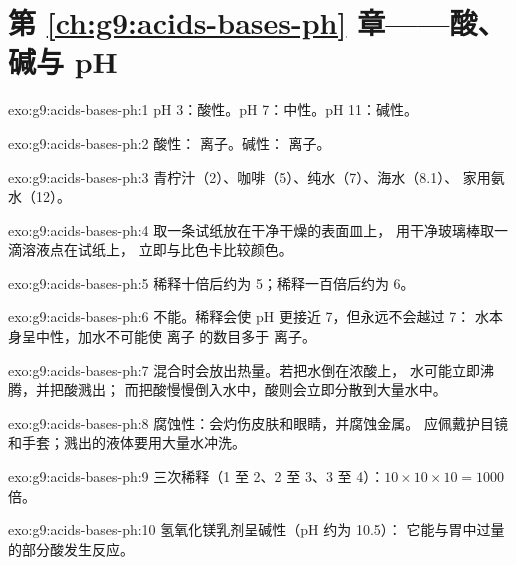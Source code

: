 \section*{第 \ref{ch:g9:acids-bases-ph} 章——酸、碱与 pH}

\begin{solution}{exo:g9:acids-bases-ph:1}
pH 3：酸性。pH 7：中性。pH 11：碱性。
\end{solution}

\begin{solution}{exo:g9:acids-bases-ph:2}
酸性： 离子。碱性： 离子。
\end{solution}

\begin{solution}{exo:g9:acids-bases-ph:3}
青柠汁（2）、咖啡（5）、纯水（7）、海水（8.1）、
家用氨水（12）。
\end{solution}

\begin{solution}{exo:g9:acids-bases-ph:4}
取一条试纸放在干净干燥的表面皿上，
用干净玻璃棒取一滴溶液点在试纸上，
立即与比色卡比较颜色。
\end{solution}

\begin{solution}{exo:g9:acids-bases-ph:5}
稀释十倍后约为 5；稀释一百倍后约为 6。
\end{solution}

\begin{solution}{exo:g9:acids-bases-ph:6}
不能。稀释会使 pH 更接近 7，但永远不会越过 7：
水本身呈中性，加水不可能使  离子
的数目多于  离子。
\end{solution}

\begin{solution}{exo:g9:acids-bases-ph:7}
混合时会放出热量。若把水倒在浓酸上，
水可能立即沸腾，并把酸溅出；
而把酸慢慢倒入水中，酸则会立即分散到大量水中。
\end{solution}

\begin{solution}{exo:g9:acids-bases-ph:8}
腐蚀性：会灼伤皮肤和眼睛，并腐蚀金属。
应佩戴护目镜和手套；溅出的液体要用大量水冲洗。
\end{solution}

\begin{solution}{exo:g9:acids-bases-ph:9}
三次稀释（1 至 2、2 至 3、3 至 4）：$10 \times 10 \times 10 =
1000$ 倍。
\end{solution}

\begin{solution}{exo:g9:acids-bases-ph:10}
氢氧化镁乳剂呈碱性（pH 约为 10.5）：
它能与胃中过量的部分酸发生反应。
\end{solution}

